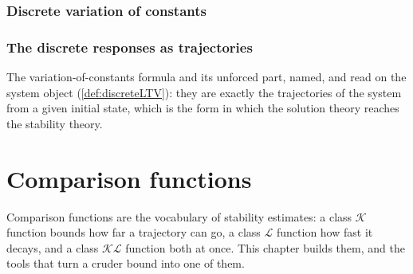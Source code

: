

\subsection{Discrete variation of constants}




\subsection{The discrete responses as trajectories}

The variation-of-constants formula and its unforced part, named, and read on the system object
(\cref{def:discreteLTV}): they are exactly the trajectories of the system from a given initial
state, which is the form in which the solution theory reaches the stability theory.












\chapter{Comparison functions}

Comparison functions are the vocabulary of stability estimates: a class $\mathcal{K}$ function
bounds how far a trajectory can go, a class $\mathcal{L}$ function how fast it decays, and a
class $\mathcal{KL}$ function both at once.  This chapter builds them, and the tools that turn a
cruder bound into one of them.

